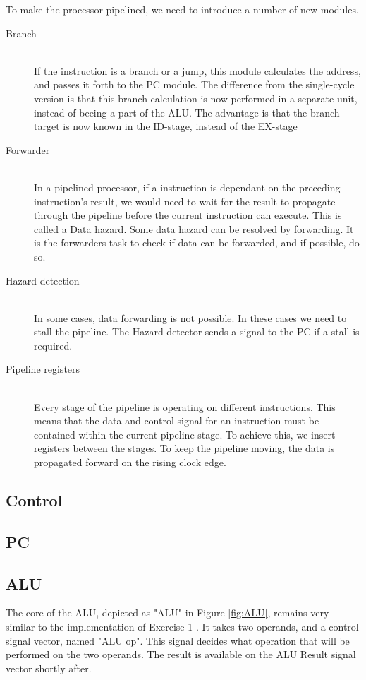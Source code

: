 To make the processor pipelined, we need to introduce a number of new modules.

\begin{description}
  \item[Branch] \hfill \\
  If the instruction is a branch or a jump, this module calculates the address, and passes it forth to the PC module. The difference from the single-cycle version is that this  branch calculation is now performed in a separate unit, instead of beeing a part of the ALU. The advantage is that the branch target is now known in the ID-stage, instead of the EX-stage 
  \item[Forwarder] \hfill \\
  In a pipelined processor, if a instruction is dependant on the preceding instruction's result, we would need to wait for the result to propagate through the pipeline before the current instruction can execute. This is called a Data hazard. Some data hazard can be resolved by forwarding. It is the forwarders task to check if data can be forwarded, and if possible, do so.
  \item[Hazard detection] \hfill \\
  In some cases, data forwarding is not possible. In these cases we need to stall the pipeline. The Hazard detector sends a signal to the PC if a stall is required.
  \item[Pipeline registers] \hfill \\
  Every stage of the pipeline is operating on different instructions. This means that the data and control signal for an instruction must be contained within the current pipeline stage. To achieve this, we insert registers between the stages. To keep the pipeline moving, the data is propagated forward on the rising clock edge. 
\end{description}

\subsection{Control}

\subsection{PC}

\subsection{ALU}
The core of the ALU, depicted as "ALU" in Figure \ref{fig:ALU}, remains very similar to the implementation of Exercise 1 \cite{ex1report}. It takes two operands, and a control signal vector, named "ALU op". This signal decides what operation that will be performed on the two operands. The result is available on the ALU Result signal vector shortly after.

